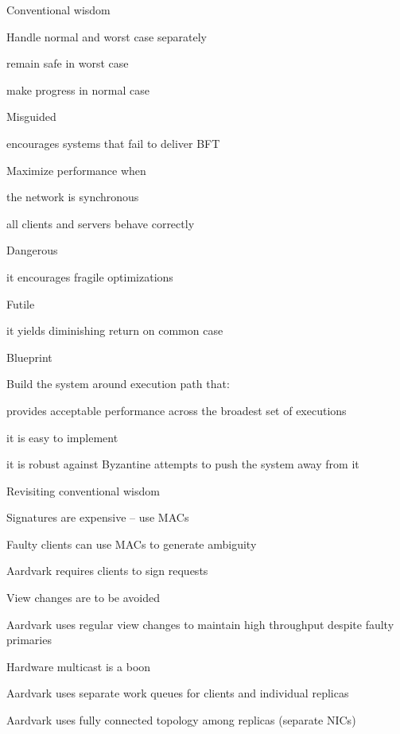 \begin{frame}{Conventional wisdom}
	
\begin{overprint}
	\BIL
	\item Handle normal and worst case separately 
		\BI
		\item remain safe in worst case
		\item make progress in normal case
		\EI
	\EIL
{}
	\BIL
	\item Misguided
		\BI
		\item encourages systems that fail to deliver BFT
		\EI
	\EIL
\end{overprint}	
\bigskip
\begin{overprint}
\BIL
\item Maximize performance when
	\BI
	\item the network is synchronous 
	\item all clients and servers behave correctly
	\EI
\EIL
{}
\BIL
\item Dangerous
	\BI
	\item it encourages \alert{fragile optimizations}
	\EI
\EIL
\end{overprint}
\BIL
\item Futile
	\BI
	\item it yields \alert{diminishing return} on common case
	\EI
\EIL

\end{frame}

\begin{frame}{Blueprint}

\BIL
\item Build the system around execution path that:
\BI
\item provides acceptable performance across the broadest set of executions
\item it is easy to implement
\item it is robust against Byzantine attempts to push the system away from it
\EI
\EIL

\end{frame}	

\begin{frame}{Revisiting conventional wisdom}
	
\BIL
\item Signatures are expensive -- use MACs 
	\BI
	\item Faulty clients can use MACs to generate ambiguity 
	\item Aardvark requires clients to sign requests
	\EI
\item View changes are to be avoided
	\BI
	\item Aardvark uses regular view changes to maintain high throughput despite faulty primaries
	\EI
\item Hardware multicast is a boon
	\BI
	\item Aardvark uses separate work queues for clients and individual replicas	
	\item Aardvark uses fully connected topology among replicas
	  (separate NICs)
	\EI
\EIL	
\end{frame}

